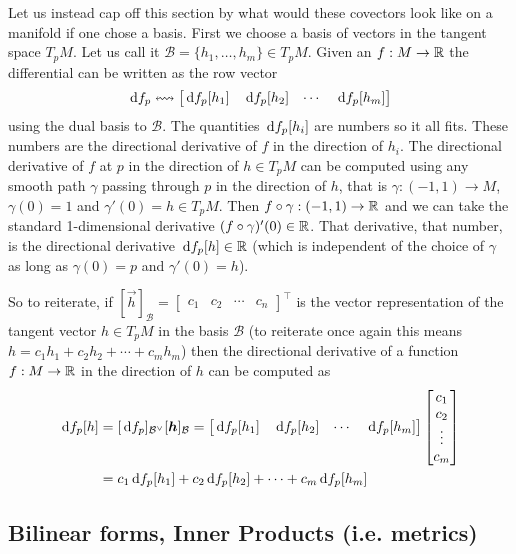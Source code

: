 \documentclass[12pt]{amsart}
\begin{document}
Let us instead cap off this section by what would these covectors look like on a manifold if one chose a basis. First we choose a basis of vectors in the tangent space $T_p M$. Let us call it $\mathcal{B} = \{h_1, \ldots, h_m\} \in T_pM$. Given an $f : M \to \mathbb{R}$ the differential can be written as the row vector 
\[
	\,\mathrm{d} f_p \leftrightsquigarrow  \begin{bmatrix} \,\mathrm{d} f_p[h_1] & \,\mathrm{d} f_p[h_2]& \cdots & \,\mathrm{d} f_p[h_m] \end{bmatrix}
\]
using the dual basis to $\mathcal{B}$. The quantities $\,\mathrm{d} f_p[h_i]$ are numbers so it all fits. These numbers are the directional derivative of $f$ in the direction of $h_i$. The directional derivative of $f$ at $p$ in the direction of $h\in T_pM$ can be computed using any smooth path $\gamma$ passing through $p$ in the direction of $h$, that is $\gamma: (-1,1) \to M$, $\gamma(0) = 1$ and $\gamma'(0) =h \in T_pM$. Then $f \circ \gamma: (-1,1) \to \mathbb{R}$ and we can take the standard 1-dimensional derivative $(f \circ \gamma)'(0) \in \mathbb{R}$. That derivative, that number, is the directional derivative $\,\mathrm{d} f_p [h] \in \mathbb{R}$ (which is independent of the choice of $\gamma$ as long as $\gamma(0) = p$ and $\gamma'(0) = h$). 

So to reiterate, if $[\vec{h}]_{\mathcal{B}} = \begin{bmatrix} c_1 & c_2 & \cdots & c_n \end{bmatrix}^\top$ is the vector representation of the tangent vector $h \in T_pM$ in the basis $\mathcal{B}$ (to reiterate once again this means $h = c_1 h_1 + c_2 h_2 + \cdots + c_m h_m$) then the directional derivative of a function $f : M \to \mathbb{R}$ in the direction of $h$ can be computed as
\begin{align*}
	\,\mathrm{d} f_p [h] &= [\,\mathrm{d} f_p]_{\mathcal{B}^\vee} [\mathbf{\boldsymbol{h}}]_{\mathcal{B}} =  \begin{bmatrix}\,\mathrm{d} f_p[h_1] & \,\mathrm{d} f_p[h_2]& \cdots & \,\mathrm{d} f_p[h_m]  \end{bmatrix} \begin{bmatrix}
	c_1 \\ c_2 \\ \vdots \\ c_m
	\end{bmatrix} \\
	&= c_1 \,\mathrm{d} f_p[h_1] + c_2 \,\mathrm{d} f_p[h_2] + \cdots  + c_m \,\mathrm{d} f_p[h_m] 
\end{align*}



\subsection{Bilinear forms, Inner Products (i.e. metrics)}
\end{document}

